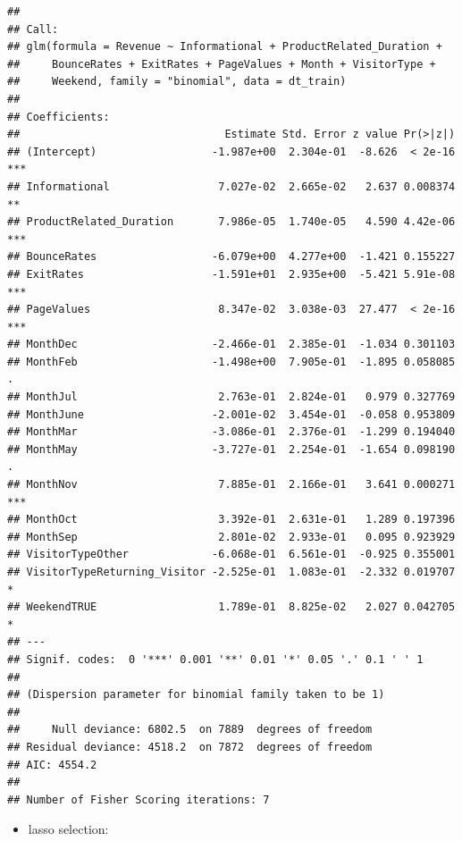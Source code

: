 \documentclass[
]{article}
\newenvironment{Shaded}{\begin{snugshade}}{\end{snugshade}}
\newcommand{\AttributeTok}[1]{\textcolor[rgb]{0.13,0.29,0.53}{#1}}
\newcommand{\DecValTok}[1]{\textcolor[rgb]{0.00,0.00,0.81}{#1}}
\newcommand{\FunctionTok}[1]{\textcolor[rgb]{0.13,0.29,0.53}{\textbf{#1}}}
\newcommand{\NormalTok}[1]{#1}
\newcommand{\OtherTok}[1]{\textcolor[rgb]{0.56,0.35,0.01}{#1}}
\newcommand{\SpecialCharTok}[1]{\textcolor[rgb]{0.81,0.36,0.00}{\textbf{#1}}}
\newcommand{\StringTok}[1]{\textcolor[rgb]{0.31,0.60,0.02}{#1}}
\providecommand{\tightlist}{%
  \setlength{\itemsep}{0pt}\setlength{\parskip}{0pt}}
\begin{document}
\begin{verbatim}
## 
## Call:
## glm(formula = Revenue ~ Informational + ProductRelated_Duration + 
##     BounceRates + ExitRates + PageValues + Month + VisitorType + 
##     Weekend, family = "binomial", data = dt_train)
## 
## Coefficients:
##                                Estimate Std. Error z value Pr(>|z|)    
## (Intercept)                  -1.987e+00  2.304e-01  -8.626  < 2e-16 ***
## Informational                 7.027e-02  2.665e-02   2.637 0.008374 ** 
## ProductRelated_Duration       7.986e-05  1.740e-05   4.590 4.42e-06 ***
## BounceRates                  -6.079e+00  4.277e+00  -1.421 0.155227    
## ExitRates                    -1.591e+01  2.935e+00  -5.421 5.91e-08 ***
## PageValues                    8.347e-02  3.038e-03  27.477  < 2e-16 ***
## MonthDec                     -2.466e-01  2.385e-01  -1.034 0.301103    
## MonthFeb                     -1.498e+00  7.905e-01  -1.895 0.058085 .  
## MonthJul                      2.763e-01  2.824e-01   0.979 0.327769    
## MonthJune                    -2.001e-02  3.454e-01  -0.058 0.953809    
## MonthMar                     -3.086e-01  2.376e-01  -1.299 0.194040    
## MonthMay                     -3.727e-01  2.254e-01  -1.654 0.098190 .  
## MonthNov                      7.885e-01  2.166e-01   3.641 0.000271 ***
## MonthOct                      3.392e-01  2.631e-01   1.289 0.197396    
## MonthSep                      2.801e-02  2.933e-01   0.095 0.923929    
## VisitorTypeOther             -6.068e-01  6.561e-01  -0.925 0.355001    
## VisitorTypeReturning_Visitor -2.525e-01  1.083e-01  -2.332 0.019707 *  
## WeekendTRUE                   1.789e-01  8.825e-02   2.027 0.042705 *  
## ---
## Signif. codes:  0 '***' 0.001 '**' 0.01 '*' 0.05 '.' 0.1 ' ' 1
## 
## (Dispersion parameter for binomial family taken to be 1)
## 
##     Null deviance: 6802.5  on 7889  degrees of freedom
## Residual deviance: 4518.2  on 7872  degrees of freedom
## AIC: 4554.2
## 
## Number of Fisher Scoring iterations: 7
\end{verbatim}

\begin{itemize}
\tightlist
\item
  lasso selection:
\end{itemize}

\begin{Shaded}
\end{Shaded}
\end{document}
